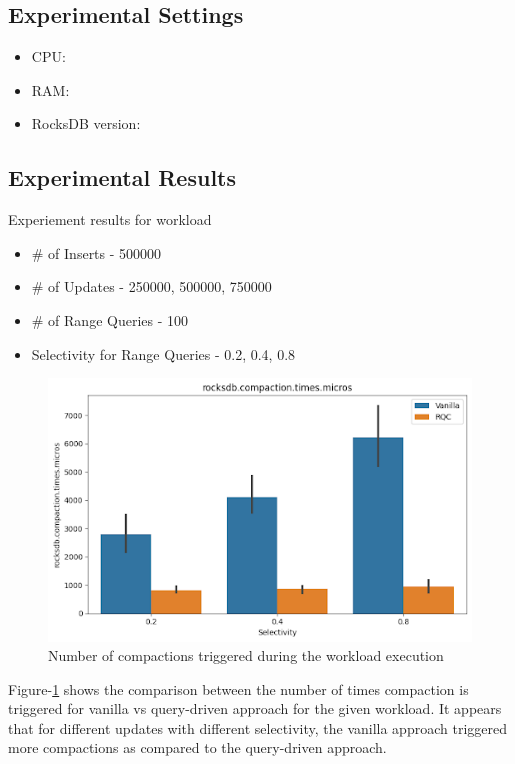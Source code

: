 \subsection{Experimental Settings}
\begin{itemize}
    \item CPU\::
    \item RAM\::
    \item RocksDB version\::
\end{itemize}

\subsection{Experimental Results}
Experiement results for workload
\begin{itemize}
    \item \# of Inserts \-- 500000
    \item \# of Updates \-- 250000, 500000, 750000
    \item \# of Range Queries \-- 100 
    \item Selectivity for Range Queries \-- 0.2, 0.4, 0.8
\end{itemize}

\begin{figure}
    \includegraphics[scale=0.45]{Figures/Compaction Times.png}
    \caption{Number of compactions triggered during the workload execution}\label{fig:compaction_times}
\end{figure}

Figure-\ref{fig:compaction_times} shows the comparison between the number of times compaction is triggered for vanilla 
vs query-driven approach for the given workload. It appears that for different updates with different selectivity, the 
vanilla approach triggered more compactions as compared to the query-driven approach.

